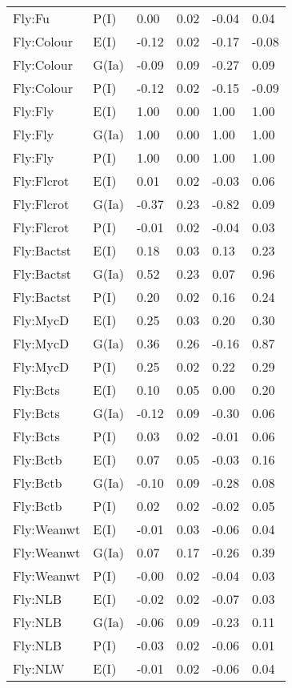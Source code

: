 \begin{center}
\begin{longtable}{|p{1.1in}|p{0.7in}|p{0.7in}|p{0.6in}|p{0.6in}|p{0.6in}|}
  Fly:Fu & P(I) & 0.00 & 0.02 & -0.04 & 0.04 \\ 
  Fly:Colour & E(I) & -0.12 & 0.02 & -0.17 & -0.08 \\ 
  Fly:Colour & G(Ia) & -0.09 & 0.09 & -0.27 & 0.09 \\ 
  Fly:Colour & P(I) & -0.12 & 0.02 & -0.15 & -0.09 \\ 
  Fly:Fly & E(I) & 1.00 & 0.00 & 1.00 & 1.00 \\ 
  Fly:Fly & G(Ia) & 1.00 & 0.00 & 1.00 & 1.00 \\ 
  Fly:Fly & P(I) & 1.00 & 0.00 & 1.00 & 1.00 \\ 
  Fly:Flcrot & E(I) & 0.01 & 0.02 & -0.03 & 0.06 \\ 
  Fly:Flcrot & G(Ia) & -0.37 & 0.23 & -0.82 & 0.09 \\ 
  Fly:Flcrot & P(I) & -0.01 & 0.02 & -0.04 & 0.03 \\ 
  Fly:Bactst & E(I) & 0.18 & 0.03 & 0.13 & 0.23 \\ 
  Fly:Bactst & G(Ia) & 0.52 & 0.23 & 0.07 & 0.96 \\ 
  Fly:Bactst & P(I) & 0.20 & 0.02 & 0.16 & 0.24 \\ 
  Fly:MycD & E(I) & 0.25 & 0.03 & 0.20 & 0.30 \\ 
  Fly:MycD & G(Ia) & 0.36 & 0.26 & -0.16 & 0.87 \\ 
  Fly:MycD & P(I) & 0.25 & 0.02 & 0.22 & 0.29 \\ 
  Fly:Bcts & E(I) & 0.10 & 0.05 & 0.00 & 0.20 \\ 
  Fly:Bcts & G(Ia) & -0.12 & 0.09 & -0.30 & 0.06 \\ 
  Fly:Bcts & P(I) & 0.03 & 0.02 & -0.01 & 0.06 \\ 
  Fly:Bctb & E(I) & 0.07 & 0.05 & -0.03 & 0.16 \\ 
  Fly:Bctb & G(Ia) & -0.10 & 0.09 & -0.28 & 0.08 \\ 
  Fly:Bctb & P(I) & 0.02 & 0.02 & -0.02 & 0.05 \\ 
  Fly:Weanwt & E(I) & -0.01 & 0.03 & -0.06 & 0.04 \\ 
  Fly:Weanwt & G(Ia) & 0.07 & 0.17 & -0.26 & 0.39 \\ 
  Fly:Weanwt & P(I) & -0.00 & 0.02 & -0.04 & 0.03 \\ 
  Fly:NLB & E(I) & -0.02 & 0.02 & -0.07 & 0.03 \\ 
  Fly:NLB & G(Ia) & -0.06 & 0.09 & -0.23 & 0.11 \\ 
  Fly:NLB & P(I) & -0.03 & 0.02 & -0.06 & 0.01 \\ 
  Fly:NLW & E(I) & -0.01 & 0.02 & -0.06 & 0.04 \\ 

\end{longtable}
\end{center}
